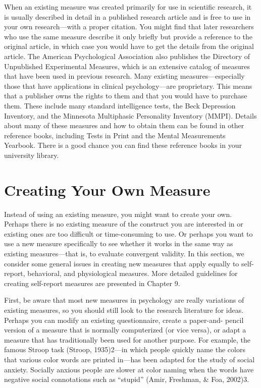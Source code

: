 \documentclass[]{book}
\theoremstyle{definition}
\theoremstyle{definition}
\theoremstyle{remark}
\begin{document}
When an existing measure was created primarily for use in scientific
research, it is usually described in detail in a published research
article and is free to use in your own research---with a proper
citation. You might find that later researchers who use the same measure
describe it only briefly but provide a reference to the original
article, in which case you would have to get the details from the
original article. The American Psychological Association also publishes
the Directory of Unpublished Experimental Measures, which is an
extensive catalog of measures that have been used in previous research.
Many existing measures---especially those that have applications in
clinical psychology---are proprietary. This means that a publisher owns
the rights to them and that you would have to purchase them. These
include many standard intelligence tests, the Beck Depression Inventory,
and the Minnesota Multiphasic Personality Inventory (MMPI). Details
about many of these measures and how to obtain them can be found in
other reference books, including Tests in Print and the Mental
Measurements Yearbook. There is a good chance you can find these
reference books in your university library.

\section{Creating Your Own Measure}\label{creating-your-own-measure}

Instead of using an existing measure, you might want to create your own.
Perhaps there is no existing measure of the construct you are interested
in or existing ones are too difficult or time-consuming to use. Or
perhaps you want to use a new measure specifically to see whether it
works in the same way as existing measures---that is, to evaluate
convergent validity. In this section, we consider some general issues in
creating new measures that apply equally to self-report, behavioral, and
physiological measures. More detailed guidelines for creating
self-report measures are presented in Chapter 9.

First, be aware that most new measures in psychology are really
variations of existing measures, so you should still look to the
research literature for ideas. Perhaps you can modify an existing
questionnaire, create a paper-and- pencil version of a measure that is
normally computerized (or vice versa), or adapt a measure that has
traditionally been used for another purpose. For example, the famous
Stroop task (Stroop, 1935)2---in which people quickly name the colors
that various color words are printed in---has been adapted for the study
of social anxiety. Socially anxious people are slower at color naming
when the words have negative social connotations such as ``stupid''
(Amir, Freshman, \& Foa, 2002)3.
\end{document}
